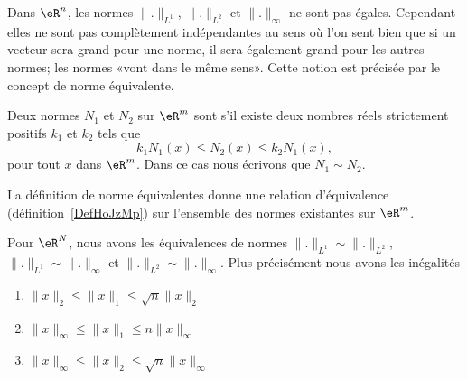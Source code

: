 Dans $\eR^n$, les normes $\| . \|_{L^1}$, $\| . \|_{L^2}$ et $\| . \|_{\infty}$ ne sont pas égales. Cependant elles ne sont pas complètement indépendantes au sens où l'on sent bien que si un vecteur sera grand pour une norme, il sera également grand pour les autres normes; les normes «vont dans le même sens». Cette notion est précisée par le concept de norme équivalente.

\begin{definition}		\label{DefEquivNorm}
    Deux normes $N_1$ et $N_2$ sur $\eR^m$ sont  s'il existe deux nombres réels strictement positifs $k_1$ et $k_2$ tels que
	\begin{equation}
		k_1N_1(x)\leq N_2(x)\leq k_2 N_1(x),
	\end{equation}
	pour tout $x$ dans $\eR^m$. Dans ce cas nous écrivons que $N_1\sim N_2$.
\end{definition}

\begin{lemma}       \label{LEMooHAITooWdtLAN}
    La définition de norme équivalentes donne une relation d'équivalence (définition~\ref{DefHoJzMp}) sur l'ensemble des normes existantes sur $\eR^m$.
\end{lemma}

\begin{proposition} \label{PropLJEJooMOWPNi}
    Pour \( \eR^N\), nous avons les équivalences de normes $\| . \|_{L^1}\sim\| . \|_{L^2}$, $\| . \|_{L^1}\sim\| . \|_{\infty}$ et $\| . \|_{L^2}\sim\| . \|_{\infty}$. Plus précisément nous avons les inégalités
    \begin{enumerate}
        \item\label{ItemABSGooQODmLNi}
           $ \| x \|_2\leq \| x \|_1\leq\sqrt{n}\| x \|_2$
        \item\label{ItemABSGooQODmLNii}
            $\| x \|_{\infty}\leq \| x \|_1\leq n \| x \|_{\infty}$
        \item\label{ItemABSGooQODmLNiii}
            $\| x \|_{\infty}\leq \| x \|_2\leq \sqrt{n}\| x \|_{\infty}$
    \end{enumerate}
\end{proposition}



